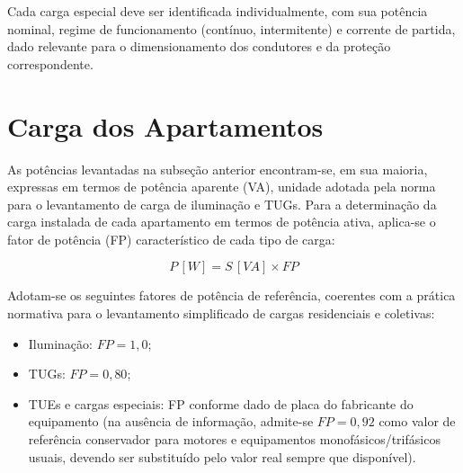 \documentclass[12pt,openright,oneside,a4paper,brazil]{abntex2}
\begin{document}
Cada carga especial deve ser identificada individualmente, com sua potência
nominal, regime de funcionamento (contínuo, intermitente) e corrente de
partida, dado relevante para o dimensionamento dos condutores e da proteção
correspondente.

\section{Carga dos Apartamentos}
\label{subsec:carga_apartamentos}
\hspace{1.27cm}
As potências levantadas na subseção anterior encontram-se, em sua maioria,
expressas em termos de potência aparente (VA), unidade adotada pela norma
para o levantamento de carga de iluminação e TUGs. Para a determinação da
carga instalada de cada apartamento em termos de potência ativa,
aplica-se o fator de potência (FP) característico de cada tipo de carga:

\begin{equation}
    P\,[\si{W}] = S\,[\si{VA}] \times FP
    \label{eq:potencia_ativa}
\end{equation}

Adotam-se os seguintes fatores de potência de referência, coerentes com a
prática normativa para o levantamento simplificado de cargas residenciais
e coletivas:

\begin{itemize}[leftmargin=1.2cm]
    \item Iluminação: $FP = 1{,}0$;
    \item TUGs: $FP = 0{,}80$;
    \item TUEs e cargas especiais: FP conforme dado de placa do fabricante
    do equipamento (na ausência de informação, admite-se $FP = 0{,}92$ como
    valor de referência conservador para motores e equipamentos
    monofásicos/trifásicos usuais, devendo ser substituído pelo valor real
    sempre que disponível).
\end{itemize}
\end{document}
